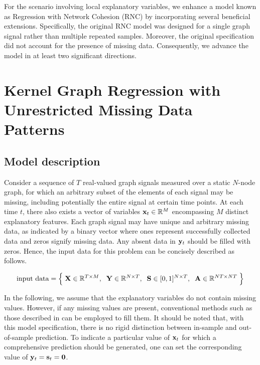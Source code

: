 For the scenario involving local explanatory variables, we enhance a model known as Regression with Network Cohesion (RNC) \citep{Li2019,Le2022} by incorporating several beneficial extensions. Specifically, the original RNC model was designed for a single graph signal rather than multiple repeated samples. Moreover, the original specification did not account for the presence of missing data. Consequently, we advance the model in at least two significant directions.

\section{Kernel Graph Regression with Unrestricted Missing Data Patterns}

\label{sec:kgr_mdp}

\subsection{Model description}

\label{sec:kgr_model_desc}

Consider a sequence of $T$ real-valued graph signals measured over a static $N$-node graph, for which an arbitrary subset of the elements of each signal may be missing, including potentially the entire signal at certain time points. At each time $t$, there also exists a vector of variables $\mathbf{x}_t \in \mathbb{R}^M$ encompassing $M$ distinct explanatory features. Each graph signal may have unique and arbitrary missing data, as indicated by a binary vector where ones represent successfully collected data and zeros signify missing data. Any absent data in $\mathbf{y}_t$ should be filled with zeros. Hence, the input data for this problem can be concisely described as follows. 


\begin{equation*}
    \text{input data} = \Big\{ \; \mathbf{X} \in \mathbb{R}^{T \times M}, \;\; \mathbf{Y} \in \mathbb{R}^{N \times T}, \;\; \mathbf{S} \in [0, 1]^{N \times T} , \;\; \mathbf{A} \in \mathbb{R}^{NT \times NT} \; \Big\}
\end{equation*}


 In the following, we assume that the explanatory variables do not contain missing values. However, if any missing values are present, conventional methods such as those described in \cite{Little2019} can be employed to fill them. It should be noted that, with this model specification, there is no rigid distinction between in-sample and out-of-sample prediction. To indicate a particular value of $\mathbf{x}_t$ for which a comprehensive prediction should be generated, one can set the corresponding value of $\mathbf{y}_t = \mathbf{s}_t = \mathbf{0}$. 

